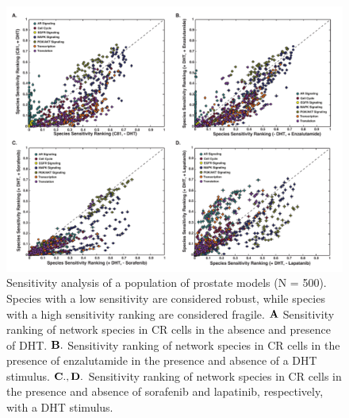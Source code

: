 \documentclass[12pt]{article}
\begin{document}
\begin{figure}\centering
\includegraphics[width=1.0\textwidth]{./figs/Supp_Figure_Sensitivity.pdf}
\caption{Sensitivity analysis of a population of prostate models (N = 500). Species with a low sensitivity are considered robust, while species with a high sensitivity ranking are considered fragile. $\bf{A}$ Sensitivity ranking of network species in CR cells in the absence and presence of DHT. $\bf{B.}$ Sensitivity ranking of network species in CR cells in the presence of enzalutamide in the presence and absence of a DHT stimulus. $\bf{C.,D.}$ Sensitivity ranking of network species in CR cells in the presence and absence of sorafenib and lapatinib, respectively, with a DHT stimulus.}
\label{fg:Supp_Sensitivity}
\end{figure}
\end{document}
